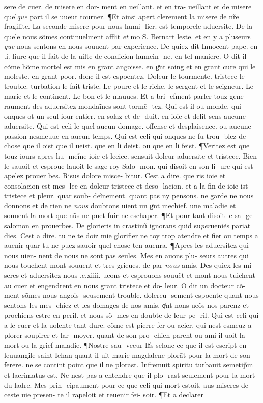 \documentclass{article}
\begin{document}
\begin{pages}
sere de cuer. de misere en dor- ment en ueillant. et en tra- ueillant et de misere quel\textit{que} part il se uueut tourner. ¶Et ainsi apert clerement la misere de nr̃e fragilite. La seconde misere pour nous humi- lier. est temporele aduersite. De la quele nous sõmes continuelment afflit \textit{et} mo S. Bernart leste. et en y a pluseurs \textit{que} nous sentons en nous souuent par experience. De quiex dit Innocent pape. en .i. liure que il fait de la uilte de condicion humein- ne. en tel maniere. O dit il cõme hõme mortel est mis en grant angoisse. en gͣnt soing et en grant cure qui le moleste. en grant poor. donc il est espoentez. Doleur le tourmente. tristece le trouble. turbation le fait triste. Le poure et le riche. le sergent et le seigneur. Le marie et le continent. Le bon et le mauues. Et a bri- efment parler touz gene- raument des aduersitez mondaĩnes sont tormẽ- tez. Qui est il ou monde. qui onques ot un seul iour entier. en solaz et de- duit. en ioie et delit sens aucune aduersite. Qui est celi le quel aucun domage. offense et desplaisence. ou aucune passion nesmeuue en aucun temps. Qui est celi qui onques ne fu trou- blez de chose que il oist que il ueist. que en li deist. ou que en li feist. ¶Veritez est que touz iours apres hu- meĩne ioie et leeice. sensuit doleur aduersite et tristece. Bien le sauoit et esproue lauoit le sage roy Salo- mon. qui disoit en son li- ure qui est apelez prouer bes. Risus dolore misce- bitur. Cest a dire. que ris ioie et consolacion est mes- lee en doleur tristece et deso- lacion. et a la fin de ioie ist tristece et pleur. quar soub- deĩnement. quant pas ny pensons. ne garde ne nous donnons et de rien ne \textit{nous} doubtons uient un gͣnt mechief. une maladie et souuent la mort que nũs ne puet fuir ne eschaper. ¶Et pour tant disoit le sa- ge salomon en prouerbes. De glorieris in crastinũ ignorans quid su\textit{per}ueniẽs pariat dies. Cest a dire. tu ne te doiz mie glorifier ne toy trop atendre et fier ou temps a auenir quar tu ne puez sauoir quel chose ten auenra. ¶Apres les aduersitez qui nous uien- nent de nous ne sont pas seules. Mes en auons plu- seurs autres qui nous touchent mont souuent et tres grieues. de par \textit{nous} amis. Des quiex les mi- seres et aduersitez nous .c.xiiii. ueons et esprouons souuẽt et mont nous tuichent au cuer et engendrent en nous grant tristece et do- leur. O dit un docteur cõ- ment sõmes nous angois- seusement trouble. dolereu- sement espoente quant nous sentons les mes- chiez et les domages de nos amis. qͣnt nons ueõs nos parenz et prochiens estre en peril. et nous sõ- mes en doubte de leur pe- ril. Qui est celi qui a le cuer et la uolente tant dure. cõme est pierre fer ou acier. qui nest esmeuz a plorer soupirer et lar- moyer. quant de son pro- chien parent ou ami il uoit la mort ou la grief maladie. ¶Nostre sau- veeur lh̾s selonc ce que il est escript en leuuangile saint Iehan quant il uit marie magdalene plorãt pour la mort de son ferere. ne se contint point que il ne plorast. Infremuit spiritu turbauit semetip̃m et lacrimatus est. Ne nest pas a entendre que il plo- rast seulement pour la mort du ladre. Mes prin- cipaument pour ce que celi qui mort estoit. aus miseres de ceste uie presen- te il rapeloit et reuenir fei- soir. ¶Et a declarer 
\end{pages}
\end{document}
